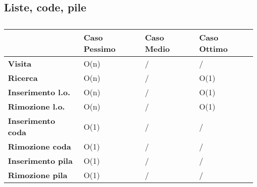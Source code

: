 \documentclass[10pt]{article}
\begin{document}
\subsection{Liste, code, pile}
\begin{table}[H]
\begin{tabular}{|l|l|l|l|}
\hline
\textbf{}                 & \textbf{Caso Pessimo} & \textbf{Caso Medio} & \textbf{Caso Ottimo} \\ \hline
\textbf{Visita}           & O(n)                  & /                   & /                    \\ \hline
\textbf{Ricerca}          & O(n)                  & /                   & O(1)                 \\ \hline
\textbf{Inserimento l.o.} & O(n)                  & /                   & O(1)                 \\ \hline
\textbf{Rimozione l.o.}   & O(n)                  & /                   & O(1)                 \\ \hline
\textbf{Inserimento coda} & O(1)                  & /                   & /                    \\ \hline
\textbf{Rimozione coda}   & O(1)                  & /                   & /                    \\ \hline
\textbf{Inserimento pila} & O(1)                  & /                   & /                    \\ \hline
\textbf{Rimozione pila}   & O(1)                  & /                   & /                    \\ \hline
\end{tabular}
\caption{}
\label{tab:my-table}
\end{table}
\end{document}
